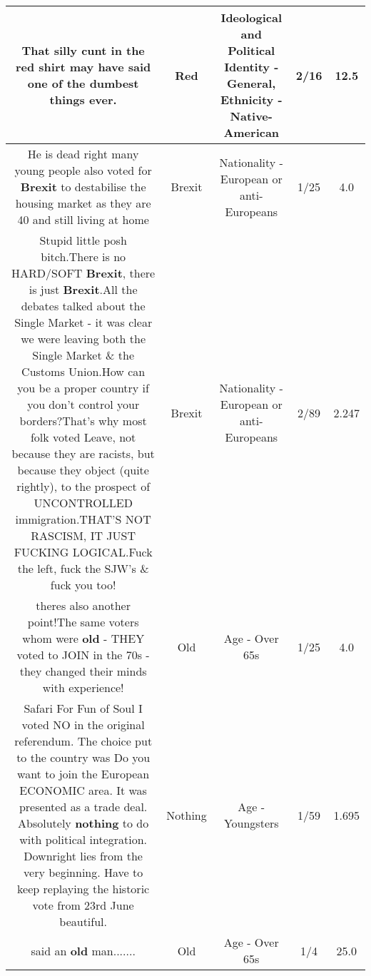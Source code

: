 \documentclass[11pt]{article}
\newlength\mylength
\begin{document}
\begin{center}
\begin{longtable}{|C{.65\mylength}|C{.30\mylength}|C{.12\mylength}|C{.12\mylength}|C{.12\mylength}|}
  \small That silly cunt in the \textbf{r\textbf{ed}} shirt may have said one of the dumbest things ever.\normalsize   & Red &  Ideological and Political Identity - General, Ethnicity - Native-American & 2/16 & 12.5 \\  \hline
  \small He is dead right many young people also voted for \textbf{Brexit} to destabilise the housing market as they are 40 and still living at home\normalsize   & Brexit & Nationality - European or anti-Europeans & 1/25 & 4.0 \\  \hline
  \small Stupid little posh bitch.There is no HARD/SOFT \textbf{Brexit}, there is just \textbf{Brexit}.All the debates talked about the Single Market - it was clear we were leaving  both the Single Market \& the Customs Union.How can you be a proper country if you don't control your borders?That's why most folk voted Leave, not because they are racists, but because they object (quite rightly), to  the prospect of UNCONTROLLED immigration.THAT'S NOT RASCISM, IT JUST FUCKING LOGICAL.Fuck the left, fuck the SJW's \& fuck you too!\normalsize   & Brexit & Nationality - European or anti-Europeans & 2/89 & 2.247 \\  \hline
  \small theres also another point!The same voters whom were \textbf{old} - THEY voted to JOIN in the 70s - they changed their minds with experience!\normalsize   & Old & Age - Over 65s & 1/25 & 4.0 \\  \hline
  \small Safari For Fun of Soul I voted  NO in the original referendum.  The choice put to the country was  Do you want to join the European ECONOMIC area.  It was presented as a trade deal.  Absolutely  \textbf{nothing} to do with political  integration.  Downright lies from the very beginning.  Have to keep replaying the historic vote from 23rd June beautiful.\normalsize   & Nothing & Age - Youngsters & 1/59 & 1.695 \\  \hline
  \small said an \textbf{old} man.......\normalsize   & Old & Age - Over 65s & 1/4 & 25.0 \\  \hline

\end{longtable}
\end{center}
\end{document}
